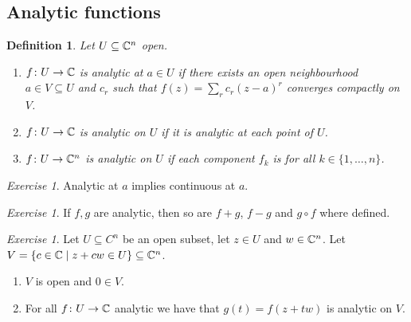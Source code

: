 \documentclass[A4paper, british]{amsart}
\theoremstyle{darkgreentheorem}
\theoremstyle{darkbluedefinition}
\newtheorem{defn}[thm]{Definition}
\theoremstyle{darkredexample}
\theoremstyle{remark}
\newtheorem{exe}[thm]{Exercise}
\newcommand{\1}{\mathbbm{1}}
\begin{document}
\subsection{Analytic functions}

\begin{defn}
    Let $U\subseteq \mathbb{C}^{n}$ open.
    \begin{enumerate}[label=\roman*)]
	\item $f\colon U\to \mathbb{C}$ is \textit{analytic} at $a\in U$ if there exists an open neighbourhood $a\in V\subseteq U$ and $c_{r}$ such that $f(z)=\sum_{r}c_{r}(z-a)^{r}$ converges compactly on $V$.
	\item $f\colon U\to \mathbb{C}$ is \textit{analytic} on $U$ if it is analytic at each point of $U$.
	\item $f\colon U\to \mathbb{C}^{n}$ is \textit{analytic} on $U$ if each component $f_{k}$ is for all $k\in \{1,\ldots, n\}$.
    \end{enumerate}
\end{defn}

\begin{exe}
    Analytic at $a$ implies continuous at $a$.
\end{exe}

\begin{exe}
    If $f,g$ are analytic, then so are $f+g$, $f-g$ and $g\circ f$ where defined.
\end{exe}

\begin{exe}
    Let $U\subseteq C^{n}$ be an open subset, let $z\in U$ and $w\in \mathbb{C}^{n}$.
    Let $V=\{c\in \mathbb{C}\mid z+cw\in U\}\subseteq \mathbb{C}^{n}$.
    \begin{enumerate}[label=\roman*)]
	\item $V$ is open and $0\in V$.
	\item For all $f\colon U\to \mathbb{C}$ analytic we have that $g(t)=f(z+tw)$ is analytic on $V$.
    \end{enumerate}
\end{exe}
\end{document}
